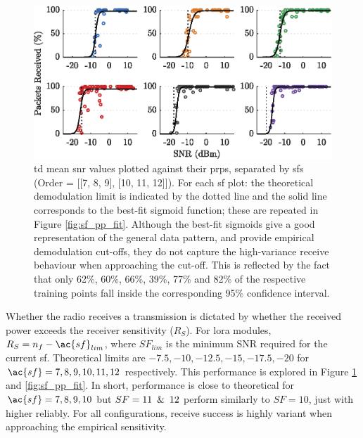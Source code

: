 \begin{figure}[H]
    \centering
   	\includegraphics{Figures/sf_pp_separate_plot}
    \caption[Plots of \ac{snr} vs \ac{prp}]{
   \ac{td} mean \ac{snr} values plotted against their \ac{prp}s, separated by \ac{sf}s (Order = [[7, 8, 9], [10, 11, 12]]). For each \ac{sf} plot: the theoretical demodulation limit is indicated by the dotted line and the solid line corresponds to the best-fit sigmoid function; these are repeated in Figure \ref{fig:sf_pp_fit}. Although the best-fit sigmoids give a good representation of the general data pattern, and provide empirical demodulation cut-offs, they do not capture the high-variance receive behaviour when approaching the cut-off. This is reflected by the fact that only 62\%, 60\%, 66\%, 39\%, 77\% and 82\% of the respective training points fall inside the corresponding 95\% confidence interval.
    }
    \label{fig:sf_pp_separate}
\end{figure}
\vspace{-0.5cm}
Whether the radio receives a transmission is dictated by whether the received power exceeds the receiver sensitivity ($R_S$). For \ac{lora} modules, $R_S = n_f - \ac{sf}_{lim}$, where $SF_{lim}$ is the minimum SNR required for the current \ac{sf}. Theoretical limits are $-7.5, -10, -12.5, -15, -17.5, -20$ for $\ac{sf} = 7, 8, 9, 10, 11, 12$ respectively. This performance is explored in Figure \ref{fig:sf_pp_separate} and \ref{fig:sf_pp_fit}. In short, performance is close to theoretical for $\ac{sf} = 7, 8, 9, 10$ but $SF=11\enskip \& \enskip 12$ perform similarly to $SF=10$, just with higher reliably. For all configurations, receive success is highly variant when approaching the empirical sensitivity.

